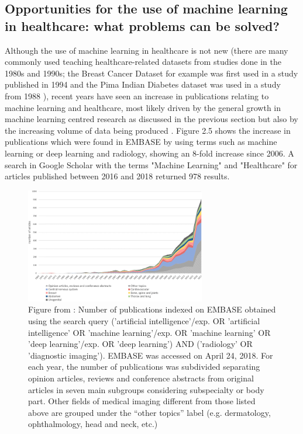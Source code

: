 \subsection{Opportunities for the use of machine learning in healthcare: what problems can be solved?}
Although the use of machine learning in healthcare is not new (there are many commonly used teaching healthcare-related datasets from studies done in the 1980s and 1990s; the Breast Cancer Dataset for example was first used in a study published in 1994 \citep{OLMangasarian:1994ue} and the Pima Indian Diabetes dataset was used in a study from 1988 \citep{Smith:1988wy}), recent years have seen an increase in publications relating to machine learning and healthcare, most likely driven by the general growth in machine learning centred research as discussed in the previous section but also by the increasing volume of data being produced \citep{Pesapane:2018kv}. Figure 2.5 shows the increase in publications which were found in EMBASE by using terms such as machine learning or deep learning and radiology, showing an 8-fold increase since 2006. A search in Google Scholar with the terms "Machine Learning" and "Healthcare" for articles published between 2016 and 2018 returned 978 results.\newline

\begin{figure}[H]
\centering
\includegraphics[width=0.7\textwidth]{ThesisTemplate/usingLatex/images/PesapaneFig.png}
\caption{Figure from \citep{Pesapane:2018kv}: Number of publications indexed on EMBASE obtained using the search query ('artificial intelligence'/exp. OR 'artificial intelligence' OR 'machine learning'/exp. OR 'machine learning' OR 'deep learning'/exp. OR 'deep learning') AND ('radiology' OR 'diagnostic imaging'). EMBASE was accessed on April 24, 2018. For each year, the number of publications was subdivided separating opinion articles, reviews and conference abstracts from original articles in seven main subgroups considering subspecialty or body part. Other fields of medical imaging different from those listed above are grouped under the “other topics” label (e.g. dermatology, ophthalmology, head and neck, etc.)}
\end{figure}

